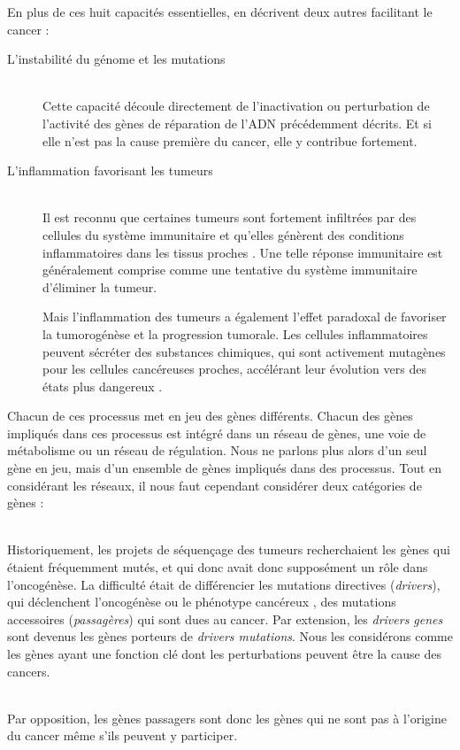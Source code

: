 			En plus de ces huit capacités essentielles, \citeauthor{Hanahan2011} en décrivent deux autres facilitant le cancer :
			\begin{description}
				\item [L'instabilité du génome et les mutations]    \hfill \\
					Cette capacité découle directement de l'inactivation ou perturbation de l'activité des gènes de réparation de l'\acs{ADN} précédemment décrits.
					Et si elle n'est pas la cause première du cancer, elle y contribue fortement.

			\pagebreak

				\item [L'inflammation favorisant les tumeurs]       \hfill \\
					Il est reconnu que certaines tumeurs sont fortement infiltrées par des cellules du système immunitaire et qu'elles génèrent des conditions inflammatoires dans les tissus proches \citep{Dvorak1986}.
					Une telle réponse immunitaire est généralement comprise comme une tentative du système immunitaire d'éliminer la tumeur.

					Mais l'inflammation des tumeurs a également l'effet paradoxal de favoriser la tumorogénèse et la progression tumorale.
					Les cellules inflammatoires peuvent sécréter des substances chimiques, qui sont activement mutagènes pour les cellules cancéreuses proches, accélérant leur évolution vers des états plus dangereux \citep{Grivennikov2010}.
			\end{description}

			Chacun de ces processus met en jeu des gènes différents.
			Chacun des gènes impliqués dans ces processus est intégré dans un réseau de gènes, une voie de métabolisme ou un réseau de régulation.
			Nous ne parlons plus alors d'un seul gène en jeu, mais d'un ensemble de gènes impliqués dans des processus.
			Tout en considérant les réseaux, il nous faut cependant considérer deux catégories de gènes :
			\begin{description}\label{def:genes}
				\item [Les gènes directeurs (\emph{drivers genes})]    \hfill \\
					Historiquement, les projets de séquençage des tumeurs recherchaient les gènes qui étaient fréquemment mutés, et qui donc avait donc supposément un rôle dans l'oncogénèse.
					La difficulté était de différencier les mutations directives (\emph{drivers}), qui déclenchent l'oncogénèse ou le phénotype cancéreux \citep{Greenman2006, Sjoblom2006, Wood2007}, des mutations accessoires (\emph{passagères}) qui sont dues au cancer.
					Par extension, les \emph{drivers genes} sont devenus les gènes porteurs de \emph{drivers mutations}.
					Nous les considérons comme les gènes ayant une fonction clé dont les perturbations peuvent être la cause des cancers.
				\item [Les gènes passagers (\emph{passengers genes})] \hfill \\
					Par opposition, les gènes passagers sont donc les gènes qui ne sont pas à l'origine du cancer même s'ils peuvent y participer.
			\end{description}

